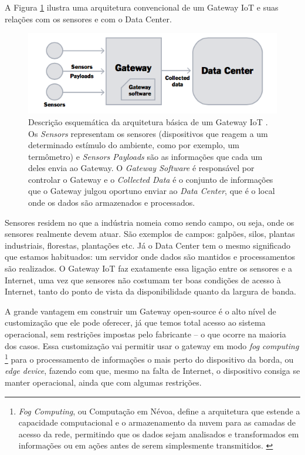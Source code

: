 A Figura \ref{fig:arquiteturaIotGateway} ilustra uma arquitetura convencional de um Gateway IoT e suas relações com os sensores e com o Data Center.
\begin{figure}[h!]
	\begin{center}
		\includegraphics[width=1\textwidth]{./img/rumFxS7.png}
		\caption{Descrição esquemática da arquitetura básica de um Gateway IoT \cite{DZone}. Os \textit{Sensors} representam os sensores (dispositivos que reagem a um determinado estímulo do ambiente, como por exemplo, um termômetro) e \textit{Sensors Payloads} são as informações que cada um deles envia ao Gateway. O \textit{Gateway Software} é responsável por controlar o Gateway e o \textit{Collected Data} é o conjunto de  informações que o Gateway julgou oportuno enviar ao \textit{Data Center}, que é o local onde os dados são armazenados e processados. }
		\label{fig:arquiteturaIotGateway}
	\end{center}
\end{figure}

Sensores residem no que a indústria nomeia como sendo campo, ou seja, onde os sensores realmente devem atuar. São exemplos de campos: galpões, silos, plantas industriais, florestas, plantações etc. Já o Data Center tem o mesmo significado que estamos habituados: um servidor onde dados são mantidos e processamentos são realizados. O Gateway IoT faz exatamente essa ligação entre os sensores e a Internet, uma vez que sensores não costumam ter boas condições de acesso à Internet, tanto do ponto de vista da disponibilidade quanto da largura de banda.

A grande vantagem em construir um Gateway open-source é o alto nível de customização que ele pode oferecer, já que temos total acesso ao sistema operacional, sem restrições impostas pelo fabricante – o que ocorre na maioria dos casos. Essa customização vai permitir usar o gateway em modo \textit{fog computing} \footnote{\textit{Fog Computing}, ou Computação em Névoa, define a arquitetura que estende a capacidade computacional e o armazenamento da nuvem para as camadas de acesso da rede, permitindo que os dados sejam analisados e transformados em informações ou em ações antes de serem simplesmente transmitidos. \cite{CIOIDG}} para o processamento de informações o mais perto do dispositivo da borda, ou \textit{edge device}, fazendo com que, mesmo na falta de Internet, o dispositivo consiga se manter operacional, ainda que com algumas restrições.

